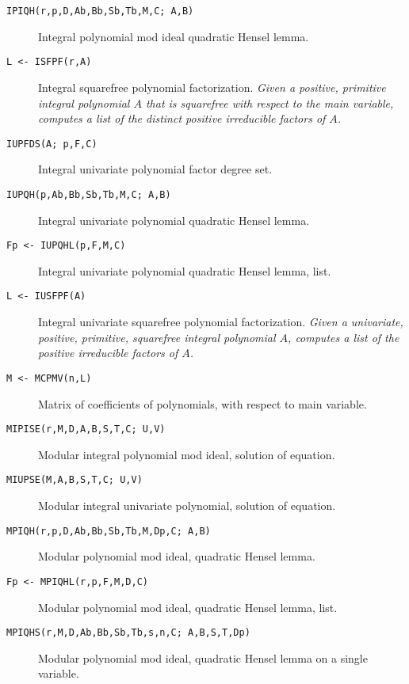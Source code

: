 \begin{description}
\begin{description}
  \item[{\tt  IPIQH(r,p,D,Ab,Bb,Sb,Tb,M,C; A,B) 
}] Integral polynomial mod ideal quadratic Hensel lemma.

  \item[{\tt L <- ISFPF(r,A) 
}] Integral squarefree polynomial factorization. {\em
Given a positive, primitive integral polynomial $A$ that is squarefree
with respect to the main variable, computes a list of the distinct
positive irreducible factors of $A$.}

  \item[{\tt  IUPFDS(A; p,F,C) 
}] Integral univariate polynomial factor degree set.

  \item[{\tt  IUPQH(p,Ab,Bb,Sb,Tb,M,C; A,B) 
}] Integral univariate polynomial quadratic Hensel lemma.

  \item[{\tt Fp <- IUPQHL(p,F,M,C) 
}] Integral univariate polynomial quadratic Hensel lemma,
                list.

  \item[{\tt L <- IUSFPF(A) 
}] Integral univariate squarefree polynomial
factorization. {\em Given a univariate, positive, primitive, squarefree
integral polynomial $A$, computes a list of the positive irreducible
factors of $A$.}

  \item[{\tt M <- MCPMV(n,L) 
}] Matrix of coefficients of polynomials, with respect to
               main variable.

  \item[{\tt  MIPISE(r,M,D,A,B,S,T,C; U,V) 
}] Modular integral polynomial mod ideal, solution of
                equation.

  \item[{\tt  MIUPSE(M,A,B,S,T,C; U,V) 
}] Modular integral univariate polynomial, solution of
                equation.

  \item[{\tt  MPIQH(r,p,D,Ab,Bb,Sb,Tb,M,Dp,C; A,B) 
}] Modular polynomial mod ideal, quadratic Hensel lemma.

  \item[{\tt Fp <- MPIQHL(r,p,F,M,D,C) 
}] Modular polynomial mod ideal, quadratic Hensel lemma,
                list.

  \item[{\tt  MPIQHS(r,M,D,Ab,Bb,Sb,Tb,s,n,C; A,B,S,T,Dp) 
}] Modular polynomial mod ideal, quadratic Hensel lemma
                on a single variable.


\end{description}
\end{description}

